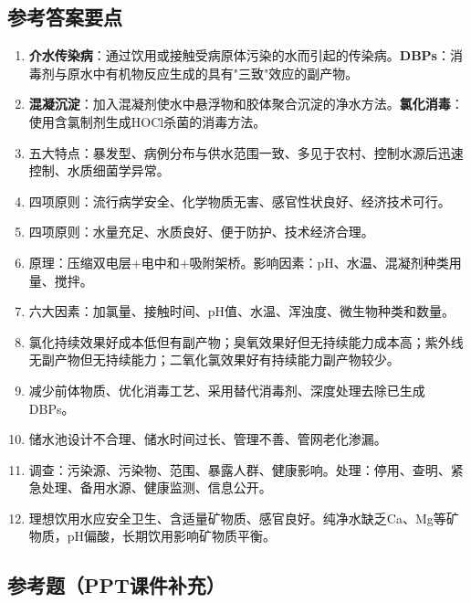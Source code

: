\documentclass[10pt,a4paper,oneside]{ctexbook}
\begin{document}
\subsection*{参考答案要点}

\begin{enumerate}[leftmargin=*, itemsep=5pt]
    \item \textbf{介水传染病}：通过饮用或接触受病原体污染的水而引起的传染病。\textbf{DBPs}：消毒剂与原水中有机物反应生成的具有"三致"效应的副产物。

    \item \textbf{混凝沉淀}：加入混凝剂使水中悬浮物和胶体聚合沉淀的净水方法。\textbf{氯化消毒}：使用含氯制剂生成HOCl杀菌的消毒方法。

    \item 五大特点：暴发型、病例分布与供水范围一致、多见于农村、控制水源后迅速控制、水质细菌学异常。

    \item 四项原则：流行病学安全、化学物质无害、感官性状良好、经济技术可行。

    \item 四项原则：水量充足、水质良好、便于防护、技术经济合理。

    \item 原理：压缩双电层+电中和+吸附架桥。影响因素：pH、水温、混凝剂种类用量、搅拌。

    \item 六大因素：加氯量、接触时间、pH值、水温、浑浊度、微生物种类和数量。

    \item 氯化持续效果好成本低但有副产物；臭氧效果好但无持续能力成本高；紫外线无副产物但无持续能力；二氧化氯效果好有持续能力副产物较少。

    \item 减少前体物质、优化消毒工艺、采用替代消毒剂、深度处理去除已生成DBPs。

    \item 储水池设计不合理、储水时间过长、管理不善、管网老化渗漏。

    \item 调查：污染源、污染物、范围、暴露人群、健康影响。处理：停用、查明、紧急处理、备用水源、健康监测、信息公开。

    \item 理想饮用水应安全卫生、含适量矿物质、感官良好。纯净水缺乏Ca、Mg等矿物质，pH偏酸，长期饮用影响矿物质平衡。
\end{enumerate}

\subsection*{参考题（PPT课件补充）}
\end{document}
